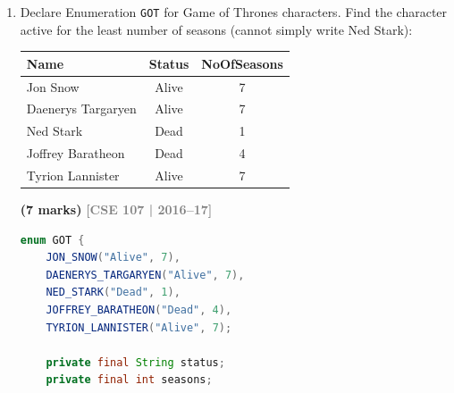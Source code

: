 \documentclass[12pt,a3paper]{article}
\newcommand{\yr}[1]{\hfill\textcolor{gray}{\small\textbf{[#1]}}}
\newcommand{\mk}[1]{\textcolor{orange!70!black}{\small\textbf{(#1 marks)}}}
\begin{document}
\begin{enumerate}
\begin{tcolorbox}[enhanced,breakable,ansbox,
  colback=cH!4,colframe=cH,boxrule=0.8pt,arc=5pt,
  title={\textbf{Answer --- \texttt{EPL} Enumeration}},
  fonttitle=\bfseries\color{white},colbacktitle=cH]
\begin{lstlisting}[language=Java]
public class Main {
    public static void main(String[] args) {
        // Print all clubs with points and position
        for (EPL club : EPL.values()) {
            System.out.println(club.name()
                + " | Points: " + club.getPoints()
                + " | Position: " + club.getPosition());
        }
    }
}
\end{lstlisting}

\textbf{Output:}
\begin{lstlisting}
MANCHESTER_UNITED | Points: 90 | Position: 1
CHELSEA | Points: 80 | Position: 2
ARSENAL | Points: 75 | Position: 4
MANCHESTER_CITY | Points: 30 | Position: 19
LIVERPOOL | Points: 25 | Position: 20
\end{lstlisting}

\end{tcolorbox}


\item Declare Enumeration \texttt{GOT} for Game of Thrones characters. Find the character active for the least number of seasons (cannot simply write Ned Stark):
\begin{center}
\begin{tabular}{lcc}
\toprule
\textbf{Name} & \textbf{Status} & \textbf{NoOfSeasons}\\
\midrule
Jon Snow & Alive & 7 \\
Daenerys Targaryen & Alive & 7 \\
Ned Stark & Dead & 1 \\
Joffrey Baratheon & Dead & 4 \\
Tyrion Lannister & Alive & 7 \\
\bottomrule
\end{tabular}
\end{center}
\mk{7}
\yr{CSE 107 | 2016--17}

\begin{tcolorbox}[enhanced,breakable,ansbox,
  colback=cH!4,colframe=cH,boxrule=0.8pt,arc=5pt,
  title={\textbf{Answer --- \texttt{GOT} Enumeration: Least Active Character}},
  fonttitle=\bfseries\color{white},colbacktitle=cH]

\begin{lstlisting}[language=Java]
enum GOT {
    JON_SNOW("Alive", 7),
    DAENERYS_TARGARYEN("Alive", 7),
    NED_STARK("Dead", 1),
    JOFFREY_BARATHEON("Dead", 4),
    TYRION_LANNISTER("Alive", 7);

    private final String status;
    private final int seasons;


\end{lstlisting}
\end{tcolorbox}
\end{enumerate}
\end{document}
